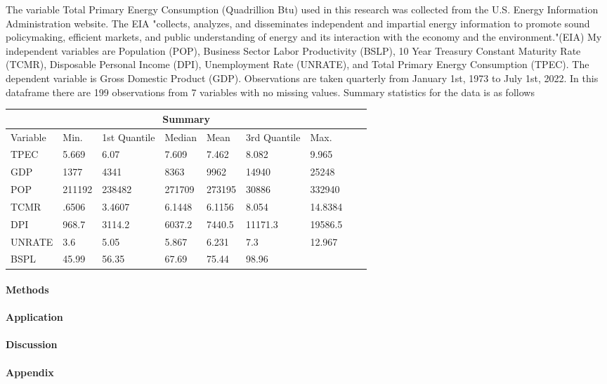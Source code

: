 \documentclass[12pt]{article}
\begin{document}
The variable Total Primary Energy Consumption (Quadrillion Btu) used in this research was collected from the U.S. Energy Information Administration website. 
The EIA "collects, analyzes, and disseminates independent and impartial energy information to promote sound policymaking, efficient markets, and public understanding of energy and its interaction with the economy and the environment."(EIA)
My independent variables are Population (POP), Business Sector Labor Productivity (BSLP), 10 Year Treasury Constant Maturity Rate (TCMR), Disposable Personal Income (DPI), Unemployment Rate (UNRATE), and Total Primary Energy Consumption (TPEC). The dependent variable is Gross Domestic Product (GDP).
Observations are taken quarterly from January 1st, 1973 to July 1st, 2022. In this dataframe there are 199 observations from 7 variables with no missing values. 
Summary statistics for the data is as follows






\begin{tabular}{ |p{2cm}||p{2cm}|p{2cm}|p{2cm}|p{2cm}|p{2cm}|p{2cm}|p{2cm}|p{2cm}|}
  \hline
  \multicolumn{9}{|c|}{Summary} \\
  \hline
  Variable & Min. & 1st Quantile & Median & Mean & 3rd Quantile & Max. \\
  \hline
  TPEC & 5.669 & 6.07& 7.609 & 7.462 & 8.082 & 9.965\\
  GDP &  1377 & 4341 & 8363 & 9962 & 14940 & 25248\\
  POP & 211192 & 238482 & 271709 & 273195 & 30886 & 332940\\
  TCMR & .6506 & 3.4607 & 6.1448 & 6.1156 & 8.054 & 14.8384\\
  DPI & 968.7 & 3114.2 & 6037.2 & 7440.5 & 11171.3 & 19586.5\\
  UNRATE & 3.6 & 5.05 & 5.867 & 6.231 & 7.3 & 12.967\\
  BSPL & 45.99 & 56.35 & 67.69 & 75.44 & 98.96\\
  \hline
 \end{tabular}












\paragraph{Methods}




\paragraph{Application}




\paragraph{Discussion}


\paragraph{Appendix}




\end{document}

